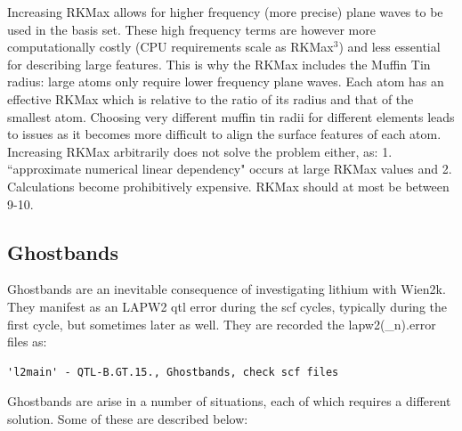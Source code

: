 \documentclass[12pt]{article}
\begin{document}
Increasing RKMax allows for higher frequency (more precise) plane waves to be used in the basis set.  These high frequency terms are however more computationally costly (CPU requirements scale as RKMax$^3$) and less essential for describing large features. This is why the RKMax includes the Muffin Tin radius: large atoms only require lower frequency plane waves.  Each atom has an effective RKMax which  is relative to the ratio of its radius and that of the smallest atom.  Choosing very different muffin tin radii for different elements leads to issues as it becomes more difficult to align the surface features of each atom.  \\

Increasing RKMax arbitrarily does not solve the problem either, as: 1. ``approximate numerical linear dependency" occurs at large RKMax values and 2. Calculations become prohibitively expensive.  RKMax should at most be  between 9-10.  

\subsection{Ghostbands}
Ghostbands are an inevitable consequence of investigating lithium with Wien2k.  They manifest as an LAPW2 qtl error during the scf cycles, typically during the first cycle, but sometimes later as well. They are recorded the lapw2(\_n).error files as:  

\begin{lstlisting}
'l2main' - QTL-B.GT.15., Ghostbands, check scf files
\end{lstlisting}

Ghostbands are arise in a number of situations, each of which requires a different solution. Some of these are described below: 
\end{document}
